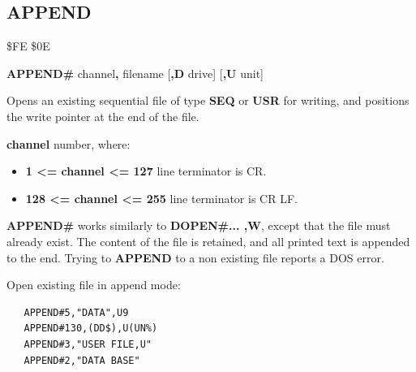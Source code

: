 
\newpage
\subsection{APPEND}
\begin{description}[leftmargin=2cm,style=nextline]
\item [Token:] \$FE \$0E
\item [Format:]
  {\bf APPEND\#} channel{\bf,} filename [{\bf,D} drive] [{\bf,U} unit]
\item [Usage:]
   Opens an existing sequential file of type
   {\bf SEQ} or {\bf USR} for writing, and positions the write pointer
   at the end of the file.

    {\bf channel} number, where:
    \begin{itemize}
        \item {\bf 1 <= channel <= 127} line terminator is CR.
        \item {\bf 128 <= channel <= 255} line terminator is CR LF.
    \end{itemize}

   \filenamedefinition

   \drivedefinition

   \unitdefinition

\item [Remarks:]
   {\bf APPEND\#} works similarly to {\bf DOPEN\#... ,W},
   except that the file must already exist.
   The content of the file is retained, and all printed text
   is appended to the end.
   Trying to {\bf APPEND} to a non existing file reports a DOS error.

\item [Examples:] Open existing file in append mode:

\begin{tcolorbox}[colback=black,coltext=white]
\verbatimfont{\codefont}
\begin{verbatim}
   APPEND#5,"DATA",U9
   APPEND#130,(DD$),U(UN%)
   APPEND#3,"USER FILE,U"
   APPEND#2,"DATA BASE"
\end{verbatim}
\end{tcolorbox}
\end{description}


\newpage
